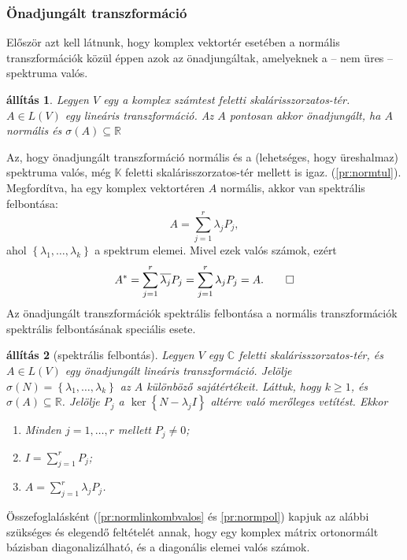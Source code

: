 \documentclass[9pt, a4paper, showtrims]{memoir}
\makeatletter
\renewenvironment{proof}[1][\proofname]
    {\par\pushQED{\qed}%
    \normalfont \topsep6\p@\@plus6\p@\relax
    \trivlist
    \item[\hskip\labelsep
        \itshape
    #1\@addpunct{:}]\ignorespaces}
    {\popQED\endtrivlist\@endpefalse}
\theoremstyle{plain}
\newtheorem{proposition}{állítás}[chapter]
\theoremstyle{remark}
\theoremstyle{definition}
\makeatother
\begin{document}
\subsubsection{Önadjungált transzformáció}
Először azt kell látnunk,
hogy komplex vektortér esetében a normális transzformációk közül éppen azok az önadjungáltak,
amelyeknek a -- nem üres -- spektruma valós.
\begin{proposition}
	Legyen $V$ egy a komplex számtest feletti skalárisszorzatos-tér.
	$A\in L\left( V \right)$ egy lineáris transzformáció.
	Az $A$ pontosan akkor önadjungált, ha $A$ normális és $\sigma\left( A \right)\subseteq\mathbb{R}$
\end{proposition}
\begin{proof}
	Az, hogy önadjungált transzformáció normális és a (lehetséges, hogy üreshalmaz) spektruma valós,
	még $\mathbb{K}$ feletti skalárisszorzatos-tér mellett is igaz. (\ref{pr:normtul}).
	Megfordítva,
	ha egy komplex vektortéren $A$ normális, akkor van spektrális felbontása:
	\[
		A=\sum_{j=1}^r\lambda_jP_j,
	\]
	ahol $\left\{ \lambda_1,\ldots,\lambda_k \right\}$ a spektrum elemei.
	Mivel ezek valós számok,
	ezért
	\[
		A^\ast=\sum_{j=1}^r\overline{\lambda_j}P_j=
		\sum_{j=1}^r\lambda_jP_j=A.
		\qedhere
	\]
\end{proof}
Az önadjungált transzformációk spektrális felbontása
a normális transzformációk spektrális felbontásának speciális esete.
\begin{proposition}[spektrális felbontás]
	Legyen $V$ egy $\mathbb{C}$ feletti skalárisszorzatos-tér, és $A\in L\left( V \right)$
	egy önadjungált lineáris transzformáció.
	Jelölje $\sigma\left( N \right)=\left\{\lambda_1,\ldots,\lambda_k  \right\}$ az $A$ különböző sajátértékeit.
	Láttuk, hogy $k\geq 1$, és $\sigma\left( A \right)\subseteq \mathbb{R}$.
	Jelölje $P_j$ a $\ker\left\{ N-\lambda_jI \right\}$ altérre való merőleges vetítést.
	Ekkor
	\begin{enumerate}
		\item Minden $j=1,\ldots,r$ mellett $P_j\neq 0$;
		\item $I=\sum_{j=1}^rP_j$;
		\item $A=\sum_{j=1}^r\lambda_jP_j$.
		      \qedhere
	\end{enumerate}
\end{proposition}
Összefoglalásként (\ref{pr:normlinkombvalos} és \ref{pr:normpol}) kapjuk az alábbi szükséges és elegendő feltételét annak,
hogy egy komplex mátrix ortonormált bázisban diagonalizálható, és a diagonális elemei valós számok.
\end{document}
